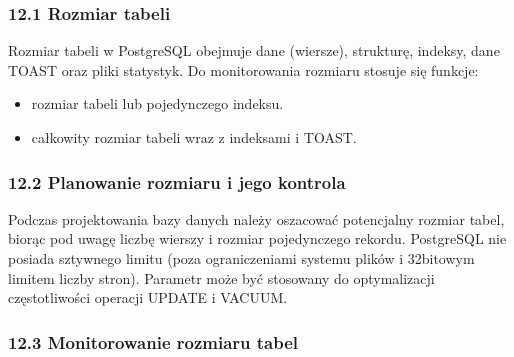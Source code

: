 \documentclass[letterpaper,10pt,polish]{sphinxmanual}
\begin{document}
\subsubsection{12.1 Rozmiar tabeli}
\label{\detokenize{rozdzial2/Konfiguracja_baz_danych/Konfiguracja_baz_danych:rozmiar-tabeli}}
\sphinxAtStartPar
Rozmiar tabeli w PostgreSQL obejmuje dane (wiersze), strukturę, indeksy, dane TOAST oraz pliki statystyk. Do monitorowania rozmiaru stosuje się funkcje:
\begin{itemize}
\item {} 
\sphinxAtStartPar
{} \textendash{} rozmiar tabeli lub pojedynczego indeksu.

\item {} 
\sphinxAtStartPar
{} \textendash{} całkowity rozmiar tabeli wraz z indeksami i TOAST.

\end{itemize}


\subsubsection{12.2 Planowanie rozmiaru i jego kontrola}
\label{\detokenize{rozdzial2/Konfiguracja_baz_danych/Konfiguracja_baz_danych:planowanie-rozmiaru-i-jego-kontrola}}
\sphinxAtStartPar
Podczas projektowania bazy danych należy oszacować potencjalny rozmiar tabel, biorąc pod uwagę liczbę wierszy i rozmiar pojedynczego rekordu. PostgreSQL nie posiada sztywnego limitu (poza ograniczeniami systemu plików i 32\sphinxhyphen{}bitowym limitem liczby stron). Parametr  może być stosowany do optymalizacji częstotliwości operacji UPDATE i VACUUM.


\subsubsection{12.3 Monitorowanie rozmiaru tabel}
\label{\detokenize{rozdzial2/Konfiguracja_baz_danych/Konfiguracja_baz_danych:monitorowanie-rozmiaru-tabel}}
\sphinxAtStartPar
{}

\begin{sphinxVerbatim}[commandchars=\\\{\}]
 
\end{sphinxVerbatim}
\end{document}
